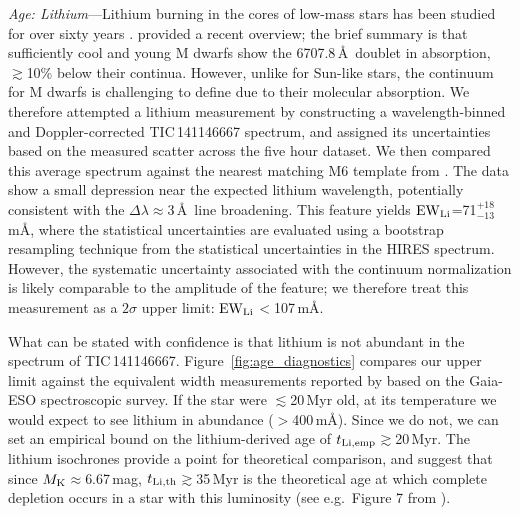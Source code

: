 \documentclass[11pt,twocolumn,tighten]{aastex7}
\begin{document}
{\it Age: Lithium}---Lithium burning in the cores of low-mass stars
has been studied for over sixty years
\citep[e.g.][]{Hayashi1963,Bildsten1997}.  \citet{Wood2023} provided a
recent overview; the brief summary is that sufficiently cool and
young M dwarfs show the 6707.8\,\AA\ doublet in absorption,
$\gtrsim$10\% below their continua.  However, unlike for Sun-like
stars, the continuum for M dwarfs is challenging to define due to
their molecular absorption.  We therefore attempted a lithium
measurement by constructing a wavelength-binned and Doppler-corrected
TIC\,141146667 spectrum, and assigned its uncertainties based on the
measured scatter across the five hour dataset.  We then compared this
average spectrum against the nearest matching M6 template from
\citet{Bochanski2007}.  The data show a small depression near the
expected lithium wavelength, potentially consistent with the $\Delta
\lambda$$\approx$3\,\AA\ line broadening.  This feature 
yields ${\rm EW}_{\rm Li}$=71$^{+18}_{-13}$\,m\AA, where the
statistical uncertainties are evaluated using a bootstrap resampling
technique from the statistical uncertainties in the HIRES spectrum.
However, the systematic uncertainty associated with the continuum
normalization is likely comparable to the amplitude of the feature;
we therefore treat this measurement as a $2\sigma$ upper
limit: ${\rm EW}_{\rm Li}$$<$107\,m\AA.


What can be stated with confidence is that lithium is not abundant in
the spectrum of TIC\,141146667.  Figure~\ref{fig:age_diagnostics}
compares our upper limit against the equivalent width measurements
reported by \citet{Jeffries2023} based on the Gaia-ESO spectroscopic
survey.  If the star were $\lesssim$20\,Myr old, at its temperature we
would expect to see lithium in abundance ($>$400\,m\AA).  Since we do
not, we can set an empirical bound on the lithium-derived age of
$t_{\rm Li,emp}$$\gtrsim$20\,Myr.  The \citet{Feiden2016} lithium
isochrones provide a point for theoretical comparison, and suggest
that since $M_{\rm K}$$\approx$6.67\,mag, $t_{\rm
Li,th}$$\gtrsim$35\,Myr is the theoretical age at which complete
depletion occurs in a star with this luminosity (see e.g.~Figure 7
from \citealt{Wood2023}).
\end{document}
